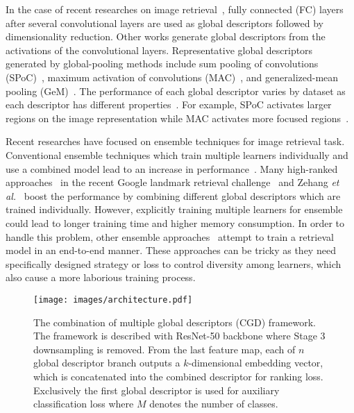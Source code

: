 \documentclass[10pt,twocolumn,letterpaper]{article}
\begin{document}
\begin{CJK}{UTF8}{mj}
In the case of recent researches on image retrieval~\cite{babenko2014neural, gordo2016deep}, fully connected (FC) layers after several convolutional layers are used as global descriptors followed by dimensionality reduction.
Other works generate global descriptors from the activations of the convolutional layers.
Representative global descriptors generated by global-pooling methods include sum pooling of convolutions (SPoC)~\cite{Babenko_2015_ICCV}, maximum activation of convolutions (MAC)~\cite{tolias2015particular}, and generalized-mean pooling (GeM)~\cite{radenovic2018fine}.
The performance of each global descriptor varies by dataset as each descriptor has different properties~\cite{boureau2010theoretical}.
For example, SPoC activates larger regions on the image representation while MAC activates more focused regions~\cite{hoang2017selective}.


Recent researches have focused on ensemble techniques for image retrieval task.
Conventional ensemble techniques which train multiple learners individually and use a combined model lead to an increase in performance~\cite{lin2018regional, Xuan_2018_ECCV, opitz2017bier, Kim_2018_ECCV}.
Many high-ranked approaches~\cite{ozaki2019large, chen20192nd} in the recent Google landmark retrieval challenge~\cite{glc2019} and Zehang \textit{et al.}~\cite{lin2018regional} boost the performance by combining different global descriptors which are trained individually.
However, explicitly training multiple learners for ensemble could lead to longer training time and higher memory consumption.
In order to handle this problem, other ensemble approaches~\cite{Kim_2018_ECCV, opitz2017bier} attempt to train a retrieval model in an end-to-end manner.
These approaches can be tricky as they need specifically designed strategy or loss to control diversity among learners, which also cause a more laborious training process.

\begin{figure*}[h!t!]
\vspace{-1em}
\begin{center}
\texttt{[image: images/architecture.pdf]}
\end{center}
\vspace*{-5mm}
  \caption{The combination of multiple global descriptors (CGD) framework.
  The framework is described with ResNet-50 backbone where Stage 3 downsampling is removed.
  From the last feature map, each of $n$ global descriptor branch outputs a $k$-dimensional embedding vector, which is concatenated into the combined descriptor for ranking loss.
  Exclusively the first global descriptor is used for auxiliary classification loss where $M$ denotes the number of classes.}
\label{fig:architecture}
\vspace{-0.3em}
\end{figure*}


\end{CJK}
\end{document}
